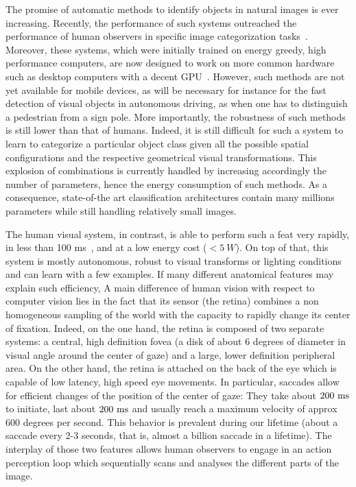 The promise of automatic methods to identify objects in natural images is ever increasing. Recently, the performance of such systems outreached the performance of human observers in specific image categorization tasks\CNS~\citep{He15}\fi. \CNS Moreover, these systems, which were initially trained on energy greedy, high performance computers, are now designed to work on more common hardware such as desktop computers with a decent GPU~\citep{Sandler18}.
However, such methods are not yet available for mobile devices, as will be necessary for instance for the fast detection of visual objects in autonomous driving, as when one has to distinguish a pedestrian from a sign pole. More importantly, the robustness of such methods is still lower than that of humans. Indeed, it is still difficult for such a system to learn to categorize a particular object class given all the possible spatial configurations and the respective geometrical visual transformations. This explosion of combinations is currently handled by increasing accordingly the number of parameters, hence the energy consumption of such methods. As a consequence, state-of-the art classification architectures contain many millions parameters while still handling relatively small images.

The human visual system, in contrast, is able to perform such a feat very rapidly, in less than 100 ms~\citep{Kirchner06}, and at a low energy cost ($<5~W$). On top of that, this system is mostly autonomous, robust to visual transforms or lighting conditions and can learn with a few examples. If many different anatomical features may explain such efficiency, \fi A main difference of human vision with respect to computer vision lies in the fact that its sensor (the retina) combines a non homogeneous sampling of the world with the capacity to rapidly change its center of fixation. Indeed, on the one hand, the retina is composed of two separate systems: a central, high definition fovea (a disk of about 6 degrees of diameter in visual angle around the center of gaze) and a large, lower definition peripheral area. On the other hand, the retina is attached on the back of the eye which is capable of low latency, high speed eye movements. \CNS In particular, saccades allow for efficient changes of the position of the center of gaze: They take about $200~\si{\milli\second}$ to initiate, last about $200~\si{\milli\second}$ and usually reach a maximum velocity of approx 600 degrees per second. This behavior is prevalent during our lifetime (about a saccade every 2-3 seconds, that is, almost a billion saccade in a lifetime). \fi The interplay of those two features allows human observers to engage in an action perception loop which sequentially scans and analyses the different parts of the image. 

